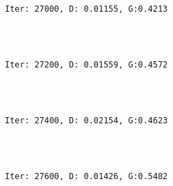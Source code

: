 \documentclass[11pt]{article}
\begin{document}
    \begin{center}
    \end{center}
    { \hspace*{\fill} \\}
    
    \begin{Verbatim}[commandchars=\\\{\}]

Iter: 27000, D: 0.01155, G:0.4213
    \end{Verbatim}

    \begin{center}
    \end{center}
    { \hspace*{\fill} \\}
    
    \begin{Verbatim}[commandchars=\\\{\}]

Iter: 27200, D: 0.01559, G:0.4572
    \end{Verbatim}

    \begin{center}
    \end{center}
    { \hspace*{\fill} \\}
    
    \begin{Verbatim}[commandchars=\\\{\}]

Iter: 27400, D: 0.02154, G:0.4623
    \end{Verbatim}

    \begin{center}
    \end{center}
    { \hspace*{\fill} \\}
    
    \begin{Verbatim}[commandchars=\\\{\}]

Iter: 27600, D: 0.01426, G:0.5482
    \end{Verbatim}

    \begin{center}
    \end{center}
    { \hspace*{\fill} \\}
    
\end{document}
